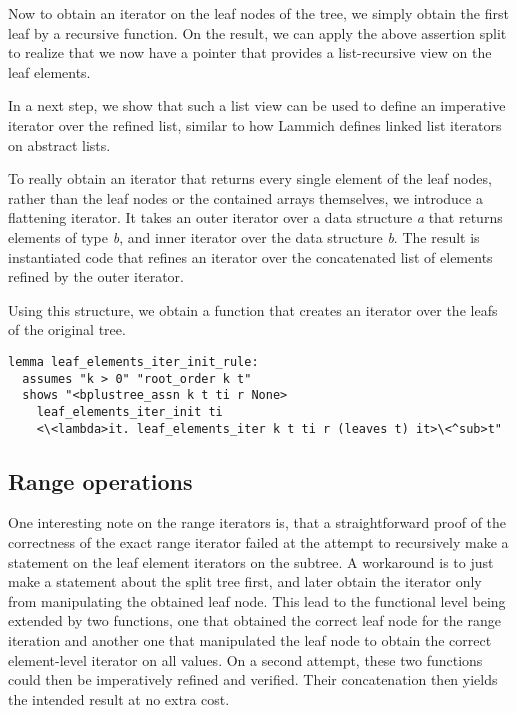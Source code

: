 \documentclass[a4paper,UKenglish,cleveref, autoref, thm-restate]{lipics-v2021}
\begin{document}
Now to obtain an iterator on the leaf nodes of the tree,
we simply obtain the first leaf by a recursive function.
On the result, we can apply the above assertion split to realize
that we now have a pointer that provides a list-recursive
view on the leaf elements.

In a next step, we show that such a list view can be used
to define an imperative iterator over the refined list,
similar to how Lammich defines linked list iterators on abstract lists.

To really obtain an iterator that returns every single element of the
leaf nodes, rather than the leaf nodes or the contained arrays themselves,
we introduce a flattening iterator.
It takes an outer iterator over a data structure \textit{a} that returns elements of type \textit{b},
and inner iterator over the data structure \textit{b}.
The result is instantiated code that refines an iterator
over the concatenated list of elements refined by the outer iterator.

Using this structure, we obtain a function that creates an iterator
over the leafs of the original tree.
\begin{lstlisting}[mathescape=true, language=Isabelle,label=lst:btree-view-split]
lemma leaf_elements_iter_init_rule:
  assumes "k > 0" "root_order k t"
  shows "<bplustree_assn k t ti r None>
    leaf_elements_iter_init ti
    <\<lambda>it. leaf_elements_iter k t ti r (leaves t) it>\<^sub>t"
\end{lstlisting}

\subsection{Range operations}
\label{sec:imperative_range}

One interesting note on the range iterators is, that a
straightforward proof of the correctness of the exact range iterator
failed at the attempt to recursively make a statement on
the leaf element iterators on the subtree.
A workaround is to just make a statement about the split tree first,
and later obtain the iterator only from manipulating the obtained leaf node.
This lead to the functional level being extended by two functions,
one that obtained the correct leaf node for the range iteration
and another one that manipulated the leaf node to obtain
the correct element-level iterator on all values.
On a second attempt, these two functions could then be imperatively
refined and verified.
Their concatenation then yields the intended result at no extra cost.
\end{document}
